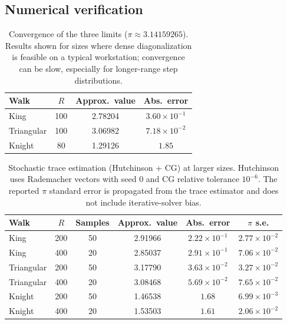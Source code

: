 \documentclass[reqno]{amsart}
\numberwithin{equation}{section}
\theoremstyle{definition}
\theoremstyle{remark}
\begin{document}
\subsection{Numerical verification}\label{app:numerical}

\begin{table}[htbp]
\centering
\caption{Convergence of the three limits ($\pi\approx3.14159265$). Results shown for sizes where dense diagonalization is feasible on a typical workstation; convergence can be slow, especially for longer-range step distributions.}
\label{tab:numeric_pi}
\begin{tabular}{@{}lccc@{}}
\toprule
Walk & $R$ & Approx.\ value & Abs.\ error \\
\midrule
King & 100 & 2.78204 & $3.60 \times 10^{-1}$ \\
\addlinespace
Triangular & 100 & 3.06982 & $7.18\times 10^{-2}$ \\
\addlinespace
Knight & 80 & 1.29126 & $1.85$ \\
\bottomrule
\end{tabular}
\end{table}

\begin{table}[htbp]
\centering
\caption{Stochastic trace estimation (Hutchinson + CG) at larger sizes. Hutchinson uses Rademacher vectors with seed $0$ and CG relative tolerance $10^{-6}$. The reported $\pi$ standard error is propagated from the trace estimator and does not include iterative-solver bias.}
\label{tab:numeric_pi_hutch}
\begin{tabular}{@{}lccccc@{}}
\toprule
Walk & $R$ & Samples & Approx.\ value & Abs.\ error & $\pi$ s.e. \\
\midrule
King & 200 & 50 & 2.91966 & $2.22\times 10^{-1}$ & $2.77\times 10^{-2}$ \\
King & 400 & 20 & 2.85037 & $2.91\times 10^{-1}$ & $7.06\times 10^{-2}$ \\
\addlinespace
Triangular & 200 & 50 & 3.17790 & $3.63\times 10^{-2}$ & $3.27\times 10^{-2}$ \\
Triangular & 400 & 20 & 3.08468 & $5.69\times 10^{-2}$ & $7.65\times 10^{-2}$ \\
\addlinespace
Knight & 200 & 50 & 1.46538 & $1.68$ & $6.99\times 10^{-3}$ \\
Knight & 400 & 20 & 1.53503 & $1.61$ & $2.06\times 10^{-2}$ \\
\bottomrule
\end{tabular}
\end{table}
\end{document}
